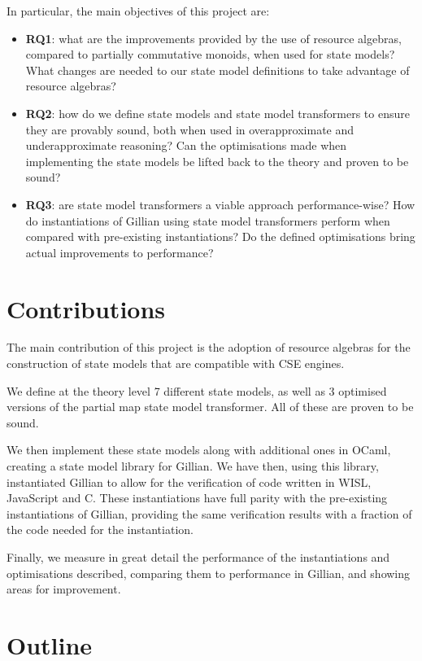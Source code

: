 In particular, the main objectives of this project are: \begin{itemize}
	\item \textbf{RQ1}: what are the improvements provided by the use of resource algebras, compared to partially commutative monoids, when used for state models? What changes are needed to our state model definitions to take advantage of resource algebras?
	\item \textbf{RQ2}: how do we define state models and state model transformers to ensure they are provably sound, both when used in overapproximate and underapproximate reasoning? Can the optimisations made when implementing the state models be lifted back to the theory and proven to be sound?
	\item \textbf{RQ3}: are state model transformers a viable approach performance-wise? How do instantiations of Gillian using state model transformers perform when compared with pre-existing instantiations? Do the defined optimisations bring actual improvements to performance?
\end{itemize}

\section{Contributions}

The main contribution of this project is the adoption of resource algebras for the construction of state models that are compatible with CSE engines. 

We define at the theory level 7 different state models, as well as 3 optimised versions of the partial map state model transformer. All of these are proven to be sound.

We then implement these state models along with additional ones in OCaml, creating a state model library for Gillian. We have then, using this library, instantiated Gillian to allow for the verification of code written in WISL, JavaScript and C. These instantiations have full parity with the pre-existing instantiations of Gillian, providing the same verification results with a fraction of the code needed for the instantiation.

Finally, we measure in great detail the performance of the instantiations and optimisations described, comparing them to performance in Gillian, and showing areas for improvement.

\section{Outline}

